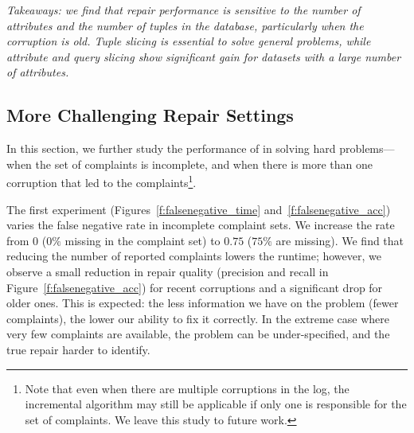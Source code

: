 \smallskip
\textit{
  Takeaways: we find that repair performance is sensitive to 
  the number of attributes and the number of tuples in the database, particularly when the corruption is old. 
  Tuple slicing is essential to solve general problems, while attribute and query slicing show significant gain for datasets with a large number of attributes.
}

\smallskip
{}
\subsection{More Challenging Repair Settings}
\label{sec:experiments:hardprob}

In this section, we further study the performance of \sys in solving hard problems---when the set of complaints is incomplete, and when there is more than one corruption that led to the complaints\footnote{
\footnotesize Note that even when there are multiple corruptions in the log, the incremental algorithm may still be applicable if only one is responsible for the set of complaints.  We leave this study to future work.}.
 
 
The first experiment (Figures~\ref{f:falsenegative_time} and~\ref{f:falsenegative_acc}) varies the false negative rate in incomplete complaint sets.
We increase the rate from $0$ ($0\%$ missing in the complaint set) to $0.75$ ($75\%$ are missing).  
We find that reducing the number of reported complaints lowers the
runtime; however, we observe a small reduction in repair quality (precision
and recall in Figure~\ref{f:falsenegative_acc}) for recent corruptions and a
significant drop for older ones. This is expected: the less information we
have on the problem (fewer complaints), the lower our ability to fix it
correctly. In the extreme case where very few complaints are available, the
problem can be under-specified, and the true repair harder to identify.



